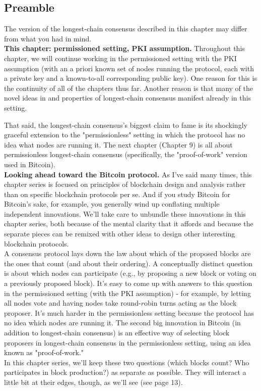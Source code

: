 \subsection{Preamble}

The version of the longest-chain consensus described in this chapter may differ from what you had in mind.\\

\noindent
\textbf{This chapter: permissioned setting, PKI assumption.} Throughout this chapter, we will continue working in the permissioned setting with the PKI assumption (with an a priori known set of nodes running the protocol, each with a private key and a known-to-all corresponding public key). One reason for this is the continuity of all of the chapters thus far. Another reason is that many of the novel ideas in and properties of longest-chain consensus manifest already in this setting.

That said, the longest-chain consensus's biggest claim to fame is its shockingly graceful extension to the "permissionless" setting in which the protocol has no idea what nodes are running it. The next chapter (Chapter 9) is all about permissionless longest-chain consensus (specifically, the "proof-of-work" version used in Bitcoin).\\

\noindent
\textbf{Looking ahead toward the Bitcoin protocol.} As I've said many times, this chapter series is focused on principles of blockchain design and analysis rather than on specific blockchain protocols per se. And if you study Bitcoin for Bitcoin's sake, for example, you generally wind up conflating multiple independent innovations. We'll take care to unbundle these innovations in this chapter series, both because of the mental clarity that it affords and because the separate pieces can be remixed with other ideas to design other interesting blockchain protocols.\\
A consensus protocol lays down the law about which of the proposed blocks are the ones that count (and about their ordering). A conceptually distinct question is about which nodes can participate (e.g., by proposing a new block or voting on a previously proposed block). It's easy to come up with answers to this question in the permissioned setting (with the PKI assumption) - for example, by letting all nodes vote and having nodes take round-$r$obin turns acting as the block proposer. It's much harder in the permissionless setting because the protocol has no idea which nodes are running it. The second big innovation in Bitcoin (in addition to longest-chain consensus) is an effective way of selecting block proposers in longest-chain consensus in the permissionless setting, using an idea known as "proof-of-work."\\
In this chapter series, we'll keep these two questions (which blocks count? Who participates in block production?) as separate as possible. They will interact a little bit at their edges, though, as we'll see (see page 13).\\

